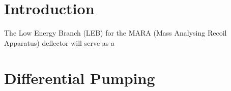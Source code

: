 





\section{Introduction}
The Low Energy Branch (LEB) for the MARA (Mass Analysing Recoil Apparatus) deflector will serve as a 
\section{Differential Pumping}




